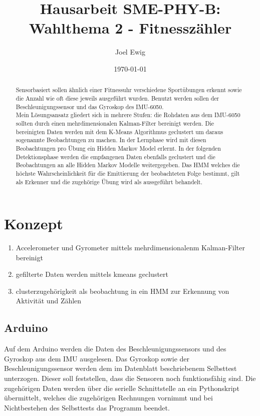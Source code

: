\documentclass{article}
\begin{document}
\title{Hausarbeit SME-PHY-B: Wahlthema 2 - Fitnessz\"ahler}
\author{Joel Ewig}
\date{\today}
\maketitle
\clearpage

\begin{abstract}
Sensorbasiert sollen ähnlich einer Fitnessuhr verschiedene Sportübungen erkennt sowie die Anzahl wie oft diese jeweils ausgeführt wurden.
Benutzt werden sollen der Beschleunigungssensor und das Gyroskop des IMU-6050.\\
Mein L\"osungsansatz gliedert sich in mehrere Stufen:
die Rohdaten aus dem IMU-6050 sollten durch einen mehrdimensionalen Kalman-Filter bereinigt werden.
Die bereinigten Daten werden mit dem K-Means Algorithmus geclustert um daraus sogenannte \glqq{}Beobachtungen\grqq{} zu machen.
In der Lernphase wird mit diesen Beobachtungen pro \"Ubung ein Hidden Markov Model erlernt.
In der folgenden Detektionsphase werden die empfangenen Daten ebenfalls geclustert und die Beobachtungen an alle Hidden Markov Modelle weitergegeben.
Das HMM welches die höchste Wahrscheinlichkeit für die Emittierung der beobachteten Folge bestimmt, gilt als Erkenner und die zugehörige Übung wird als aussgeführt behandelt.
\end{abstract}
\clearpage

\tableofcontents
\clearpage


\section{Konzept}
\begin{enumerate}
\item Accelerometer und Gyrometer mittels mehrdimensionalenm Kalman-Filter bereinigt
\item gefilterte Daten werden mittels kmeans geclustert
\item clusterzugeh\"origkeit als beobachtung in ein HMM zur Erkennung von Aktivit\"at und Z\"ahlen
\end{enumerate}
\subsection{Arduino}
Auf dem Arduino werden die Daten des Beschleunigungssensors und des Gyroskop aus dem IMU ausgelesen.
Das Gyroskop sowie der Beschleunigungssensor werden dem im Datenblatt beschriebenem Selbsttest unterzogen.
Dieser soll feststellen, dass die Sensoren noch funktionsf\"ahig sind.
Die zugeh\"origen Daten werden \"uber die serielle Schnittstelle an ein Pythonskript \"ubermittelt, welches die zugeh\"origen Rechnungen vornimmt und bei Nichtbestehen des Selbsttests das Programm beendet.\\
\end{document}
